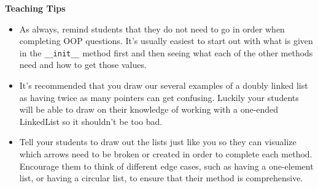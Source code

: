 
\begin{blocksection}
\begin{guide}
\textbf{Teaching Tips}
\begin{itemize}
	\item As always, remind students that they do not need to go in order when completing OOP questions. It's usually easiest to start out with what is given in the \lstinline{__init__} method first and then seeing what each of the other methods need and how to get those values.
	\item It's recommended that you draw our several examples of a doubly linked list as having twice as many pointers can get confusing. Luckily your students will be able to draw on their knowledge of working with a one-ended LinkedList so it shouldn't be too bad.
	\item Tell your students to draw out the lists just like you so they can visualize which arrows need to be broken or created in order to complete each method. Encourage them to think of different edge cases, such as having a one-element list, or having a circular list, to ensure that their method is comprehensive.
\end{itemize}
\end{guide}
\end{blocksection}
